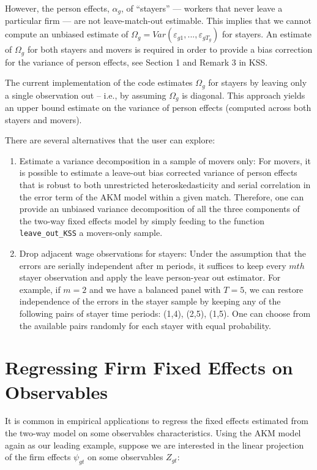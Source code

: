 \documentclass[11pt]{article}
\begin{document}
However, the person effects, \(\alpha_{g}\), of ``stayers'' --- workers
that never leave a particular firm --- are not leave-match-out
estimable. This implies that we cannot compute an unbiased estimate of
\(\Omega_{g}=Var(\varepsilon_{g1},...,\varepsilon_{gT_{g}})\) for
stayers. An estimate of \(\Omega_{g}\) for both stayers and movers is
required in order to provide a bias correction for the variance of
person effects, see Section 1 and Remark 3 in KSS.

The current implementation of the code estimates 
$\Omega_{g}$ for stayers by leaving only a single observation out -- i.e., by assuming $\Omega_g$ is diagonal. This approach yields an upper bound estimate on
the variance of person effects (computed across both stayers and
movers).

There are several alternatives that the user can explore:

\begin{enumerate}
\def\labelenumi{\arabic{enumi}.}
\item
  Estimate a variance decomposition in a sample of movers only: For
  movers, it is possible to estimate a leave-out bias corrected variance
  of person effects that is robust to both unrestricted
  heteroskedasticity and serial correlation in the error term of the AKM
  model within a given match. Therefore, one can provide an unbiased
  variance decomposition of all the three components of the two-way
  fixed effects model by simply feeding to the function
  \texttt{leave\_out\_KSS} a movers-only sample.
\item
  Drop adjacent wage observations for stayers: Under the assumption that
  the errors are serially independent after m periods, it suffices to
  keep every \(mth\) stayer observation and apply the leave person-year
  out estimator. For example, if \(m=2\) and we have a balanced panel
  with \(T=5\), we can restore independence of the errors in the stayer
  sample by keeping any of the following pairs of stayer time periods:
  (1,4), (2,5), (1,5). One can choose from the available pairs randomly
  for each stayer with equal probability.
\end{enumerate}

    \hypertarget{regressing-firm-fixed-effects-on-observables}{%
\section{Regressing Firm Fixed Effects on
Observables}\label{regressing-firm-fixed-effects-on-observables}}
\label{sec:lincom}
It is common in empirical applications to regress the fixed effects
estimated from the two-way model on some observables characteristics.
Using the AKM model again as our leading example, suppose we are
interested in the linear projection of the firm effects \(\psi_{gt}\)
on some observables \(Z_{gt}\):
\end{document}
